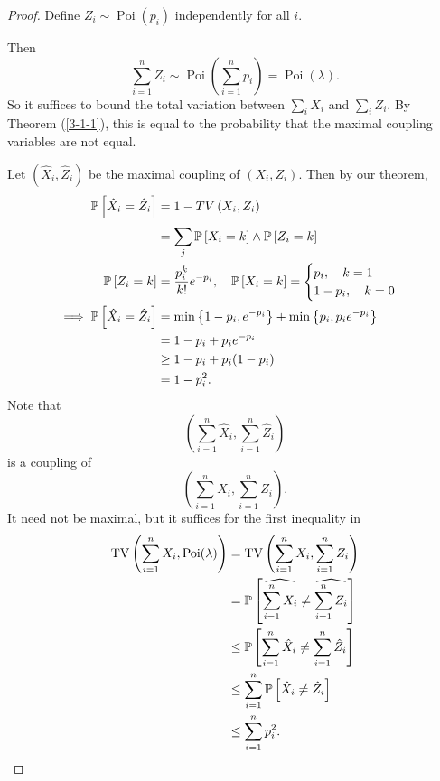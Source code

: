 \begin{proof}
	Define $Z_i \sim \operatorname{Poi}(p_i)$ independently for all $i$.

	Then \[
		\sum\limits_{i=1}^{n} Z_i \sim \operatorname{Poi}(\sum\limits_{i=1}^{n} p_i ) = \operatorname{Poi}(\lambda)
	.\] So it suffices to bound the total variation between $\sum_{i}^{} X_i$ and $\sum_{i}^{} Z_i$. By Theorem (\ref{3-1-1}), this is equal to the probability that the maximal coupling variables are not equal.
	
	Let $\left( \hat{X}_i, \hat{Z}_i \right)$ be the maximal coupling of $\left( X_i,Z_i \right)$. Then by our theorem,
	\begin{align*}
		\P\left[\hat{X}_i = \hat{Z}_i\right] 
		&= 1- TV\left( X_i, Z_i \right)\\
		&= \sum\limits_{j}^{} \P\left[X_i = k\right]  \wedge \P\left[Z_i = k\right]  \\
		\P\left[Z_i = k\right] &= \frac{p_i^{k}}{k!} e^{-p_i}, \quad \P\left[X_i = k\right] = \begin{cases}
			p_i, \quad k= 1 \\ 1-p_i, \quad k= 0
		\end{cases} \\
		\implies \P\left[\hat{X}_i = \hat{Z}_i\right] 
							   &= \min \left\{1-p_i, e^{-p_i}\right\} + \min \left\{p_i, p_i e^{-p_i}\right\} \\
							   &= 1- p_i + p_i e^{-p_i}	\\
							   &\ge 1- p_i + p_i (1-p_i) \\
							   &= 1-p_i^2
	.\end{align*}
		Note that
		\[
			\left( \sum_{i=1}^{n} \hat{X}_i, \sum_{i=1}^{n} \hat{Z}_i \right)
		\]
		is a coupling of
		\[
			\left( \sum_{i=1}^{n} X_i, \sum_{i=1}^{n} Z_i \right).
		\]
		It need not be maximal, but it suffices for the first inequality in
		\begin{align*}
			\operatorname{TV}\left( \sum\limits_{i=1}^{n} X_i, \operatorname{Poi}(\lambda) \right)
			&= \operatorname{TV}\left( \sum\limits_{i=1}^{n} X_i, \sum\limits_{i=1}^{n} Z_i \right) \\
		&= \P\left[\widehat{\sum\limits_{i=1}^{n} X_i} \ne \widehat{\sum\limits_{i=1}^{n} Z_i}\right]  \\
		&\le \P\left[\sum\limits_{i=1}^{n} \hat{X}_i \ne \sum\limits_{i=1}^{n} \hat{Z}_i\right] \\
		&\le \sum\limits_{i=1}^{n} \P\left[\hat{X}_i \ne \hat{Z}_i\right] \\
		&\le \sum\limits_{i=1}^{n} p_i^2
	.\end{align*}
\end{proof}

